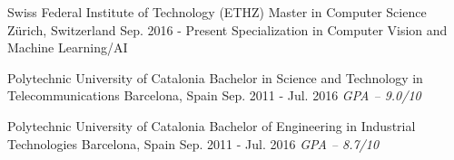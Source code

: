 
\begin{cventries}

\cventry
  {Swiss Federal Institute of Technology (ETHZ)}
  {Master in Computer Science}
  {Z\"urich, Switzerland}
  {Sep. 2016 - Present}
  {Specialization in Computer Vision and Machine Learning/AI}

\cventry
  {Polytechnic University of Catalonia}
  {Bachelor in Science and Technology in Telecommunications}
  {Barcelona, Spain}
  {Sep. 2011 - Jul. 2016}
  {\textit{GPA -- 9.0/10}}

\cventry
  {Polytechnic University of Catalonia}
  {Bachelor of Engineering in Industrial Technologies}
  {Barcelona, Spain}
  {Sep. 2011 - Jul. 2016}
  {\textit{GPA -- 8.7/10}}


\end{cventries}
